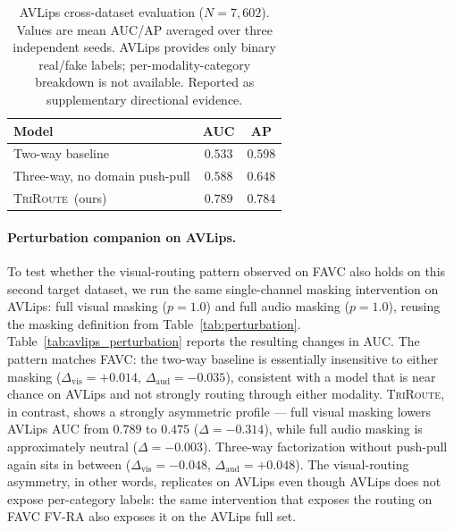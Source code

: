 \documentclass{article}
\newcommand{\method}{\textsc{TriRoute}}
\begin{document}
\begin{table}[t]
    \centering
    \caption{AVLips cross-dataset evaluation ($N=7{,}602$). Values are mean AUC/AP averaged over three independent seeds. AVLips provides only binary real/fake labels; per-modality-category breakdown is not available. Reported as supplementary directional evidence.}
    \label{tab:avlips}
    \small
    \begin{tabular}{lcc}
        \toprule
        Model & AUC & AP \\
        \midrule
        Two-way baseline        & $0.533$ & $0.598$ \\
        Three-way, no domain push-pull & $0.588$ & $0.648$ \\
        \method\ (ours)         & $\mathbf{0.789}$ & $\mathbf{0.784}$ \\
        \bottomrule
    \end{tabular}
\end{table}

\paragraph{Perturbation companion on AVLips.}
To test whether the visual-routing pattern observed on FAVC also holds on this second target dataset, we run the same single-channel masking intervention on AVLips: full visual masking ($p=1.0$) and full audio masking ($p=1.0$), reusing the masking definition from Table~\ref{tab:perturbation}. Table~\ref{tab:avlips_perturbation} reports the resulting changes in AUC. The pattern matches FAVC: the two-way baseline is essentially insensitive to either masking ($\Delta_\mathrm{vis}=+0.014$, $\Delta_\mathrm{aud}=-0.035$), consistent with a model that is near chance on AVLips and not strongly routing through either modality. \method, in contrast, shows a strongly asymmetric profile --- full visual masking lowers AVLips AUC from $0.789$ to $0.475$ ($\Delta=-0.314$), while full audio masking is approximately neutral ($\Delta=-0.003$). Three-way factorization without push-pull again sits in between ($\Delta_\mathrm{vis}=-0.048$, $\Delta_\mathrm{aud}=+0.048$). The visual-routing asymmetry, in other words, replicates on AVLips even though AVLips does not expose per-category labels: the same intervention that exposes the routing on FAVC FV-RA also exposes it on the AVLips full set.
\end{document}
